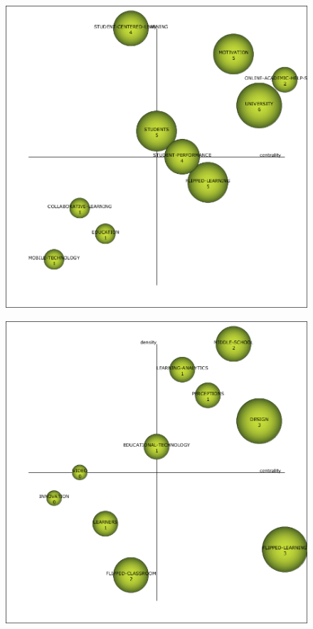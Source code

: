 \documentclass{textolivre-html}
\begin{document}
\begin{figure}[htbp]
\begin{minipage}{.45\textwidth}
 \label{fig04b}
 \end{minipage}
 \par\vspace{2ex}
 \begin{minipage}{.45\textwidth}
 \includegraphics[width=\textwidth]{Fig04c.png}
 \label{fig04c}
 \end{minipage}
 \hfill
 \begin{minipage}{.45\textwidth}
 \includegraphics[width=\textwidth]{Fig04d.png}

\end{minipage}
\end{figure}
\end{document}
